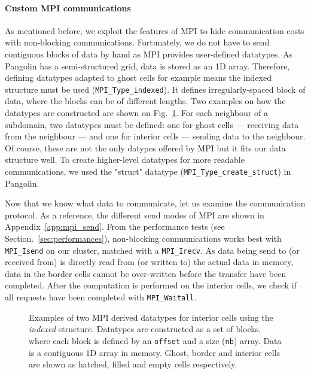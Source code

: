 \paragraph{Custom MPI communications}
As mentioned before, we exploit the features of \gls{MPI} to hide 
communication costs with non-blocking communications. Fortunately, we do not have
to send contiguous blocks of data by hand as MPI provides user-defined
datatypes. As Pangolin has a semi-structured grid, data is stored as an 1D array.
Therefore, defining datatypes adapted to ghost cells for example means the
indexed structure must be used (\texttt{MPI\_Type\_indexed}). It defines 
irregularly-spaced block of data, where the blocks can be of different
lengths.
Two examples on how the datatypes are constructed are shown on
Fig.~\ref{fig:datatypes}. For each neighbour of a subdomain, two datatypes must be
defined: one for ghost cells --- receiving data from the neighbour --- and one
for interior cells --- sending data to the neighbour. Of course, these are not
the only datypes offered by MPI but it fits our data structure well.  To create
higher-level datatypes for more readable communications, we used the "struct"
datatype (\texttt{MPI\_Type\_create\_struct}) in Pangolin.

Now that we know what data to communicate, let us examine the communication
protocol. As a reference, the different send modes of MPI are shown in
Appendix~\ref{app:mpi_send}. From the performance tests (see 
Section.~\ref{sec:performances}), non-blocking communications works best with
\texttt{MPI\_Isend} on our cluster, matched with a \texttt{MPI\_Irecv}. As data
being send to (or received from) is directly read from (or written to) the
actual data in memory, data in the border cells cannot be over-written before the
transfer have been completed. After the computation is performed on the interior
cells, we check if all requests have been completed with \texttt{MPI\_Waitall}.

\begin{figure}
  \hfill
  \caption{Examples of two MPI derived datatypes for interior cells using the
    \textit{indexed} structure. Datatypes are constructed as a set of blocks, where
    each block is defined by an \texttt{offset} and a size (\texttt{nb}) array. Data
    is a contiguous 1D array in memory. Ghost, border and interior cells are
  shown as hatched, filled and empty cells respectively.}
  \label{fig:datatypes}
\end{figure}

